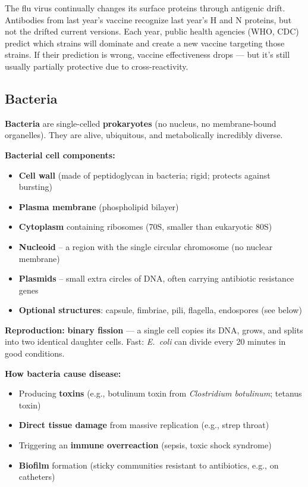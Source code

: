 \documentclass[11pt, letterpaper]{article}
\begin{document}
The flu virus continually changes its surface proteins through antigenic drift. Antibodies
from last year's vaccine recognize last year's H and N proteins, but not the drifted current
versions. Each year, public health agencies (WHO, CDC) predict which strains will dominate
and create a new vaccine targeting those strains. If their prediction is wrong, vaccine
effectiveness drops --- but it's still usually partially protective due to cross-reactivity.

\subsection*{Bacteria}

\textbf{Bacteria} are single-celled \textbf{prokaryotes} (no nucleus, no membrane-bound
organelles). They are alive, ubiquitous, and metabolically incredibly diverse.

\textbf{Bacterial cell components:}
\begin{itemize}[noitemsep]
  \item \textbf{Cell wall} (made of peptidoglycan in bacteria; rigid; protects against bursting)
  \item \textbf{Plasma membrane} (phospholipid bilayer)
  \item \textbf{Cytoplasm} containing ribosomes (70S, smaller than eukaryotic 80S)
  \item \textbf{Nucleoid} -- a region with the single circular chromosome (no nuclear membrane)
  \item \textbf{Plasmids} -- small extra circles of DNA, often carrying antibiotic resistance genes
  \item \textbf{Optional structures}: capsule, fimbriae, pili, flagella, endospores (see below)
\end{itemize}

\textbf{Reproduction:} \textbf{binary fission} --- a single cell copies its DNA, grows, and
splits into two identical daughter cells. Fast: \textit{E.\ coli} can divide every 20 minutes
in good conditions.

\textbf{How bacteria cause disease:}
\begin{itemize}[noitemsep]
  \item Producing \textbf{toxins} (e.g., botulinum toxin from \textit{Clostridium botulinum}; tetanus toxin)
  \item \textbf{Direct tissue damage} from massive replication (e.g., strep throat)
  \item Triggering an \textbf{immune overreaction} (sepsis, toxic shock syndrome)
  \item \textbf{Biofilm} formation (sticky communities resistant to antibiotics, e.g., on catheters)
\end{itemize}
\end{document}
